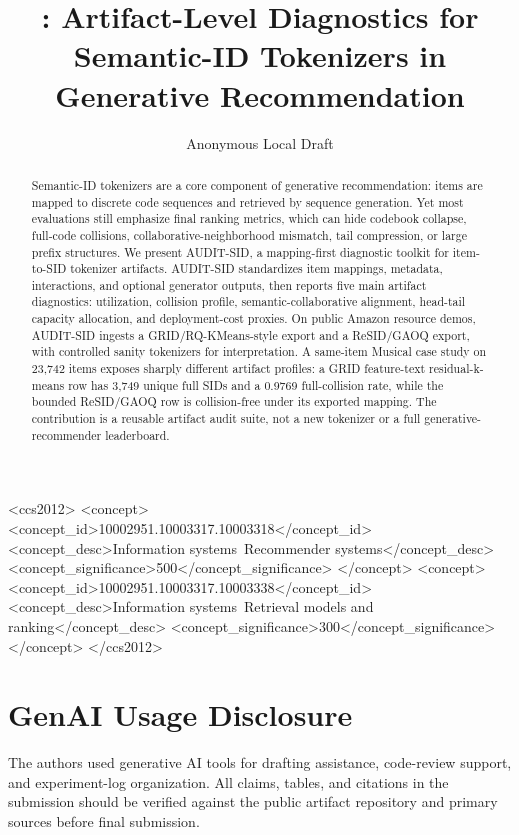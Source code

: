 \documentclass[sigconf,review,anonymous]{acmart}
\title{\tool: Artifact-Level Diagnostics for Semantic-ID Tokenizers in Generative Recommendation}
\author{Anonymous Local Draft}
\affiliation{%
  \institution{Anonymous Institution}
  \country{}
}
\newcommand{\tool}{AUDIT-SID\xspace}
\newcommand{\sid}{SID\xspace}
\begin{document}
\begin{CCSXML}
<ccs2012>
 <concept>
  <concept_id>10002951.10003317.10003318</concept_id>
  <concept_desc>Information systems~Recommender systems</concept_desc>
  <concept_significance>500</concept_significance>
 </concept>
 <concept>
  <concept_id>10002951.10003317.10003338</concept_id>
  <concept_desc>Information systems~Retrieval models and ranking</concept_desc>
  <concept_significance>300</concept_significance>
 </concept>
</ccs2012>
\end{CCSXML}


\begin{abstract}
Semantic-ID tokenizers are a core component of generative recommendation:
items are mapped to discrete code sequences and retrieved by sequence
generation. Yet most evaluations still emphasize final ranking metrics, which
can hide codebook collapse, full-code collisions, collaborative-neighborhood
mismatch, tail compression, or large prefix structures. We present
\tool, a mapping-first diagnostic toolkit for item-to-\sid tokenizer
artifacts. \tool standardizes item mappings, metadata, interactions, and
optional generator outputs, then reports five main artifact diagnostics:
utilization, collision profile, semantic-collaborative alignment, head-tail
capacity allocation, and deployment-cost proxies. On public Amazon resource
demos, \tool ingests a GRID/RQ-KMeans-style export and a ReSID/GAOQ export,
with controlled sanity tokenizers for interpretation. A same-item Musical
case study on 23,742 items exposes sharply different artifact profiles: a
GRID feature-text residual-k-means row has 3,749 unique full \sid{}s and a
0.9769 full-collision rate, while the bounded ReSID/GAOQ row is
collision-free under its exported mapping. The contribution is a reusable
artifact audit suite, not a new tokenizer or a full generative-recommender
leaderboard.
\end{abstract}

\maketitle









\section*{GenAI Usage Disclosure}
The authors used generative AI tools for drafting assistance, code-review
support, and experiment-log organization. All claims, tables, and citations in
the submission should be verified against the public artifact repository and
primary sources before final submission.
\end{document}
